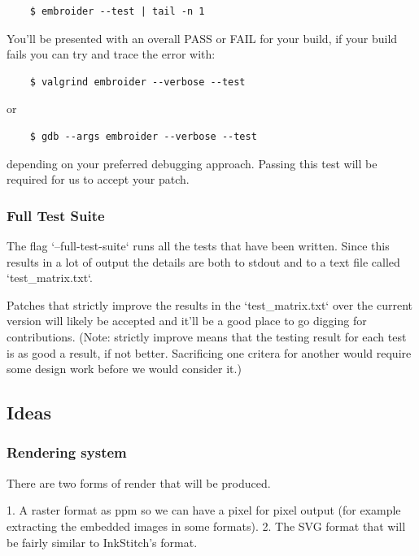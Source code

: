 \documentclass[a4paper, 11pt]{report}
\begin{document}
\begin{verbatim}
    $ embroider --test | tail -n 1
\end{verbatim}

You'll be presented with an overall PASS or FAIL for your build,
if your build fails you can try and trace the error with:

\begin{verbatim}
    $ valgrind embroider --verbose --test
  \end{verbatim}

or

\begin{verbatim}
    $ gdb --args embroider --verbose --test
  \end{verbatim}

depending on your preferred debugging approach. Passing this test
will be required for us to accept your patch.

\subsubsection{Full Test Suite}

The flag `--full-test-suite` runs all the tests that have been written.
Since this results in a lot of output the details are both to stdout
and to a text file called `test\_matrix.txt`.

Patches that strictly improve the results in the `test\_matrix.txt` over
the current version will likely be accepted and it'll be a good place
to go digging for contributions. (Note: strictly improve means that
the testing result for each test is as good a result, if not better.
Sacrificing one critera for another would require some design work
before we would consider it.)

\subsection{Ideas}

\subsubsection{Rendering system}

There are two forms of render that will be produced.

1. A raster format as ppm so we can have a pixel for pixel output (for example extracting the embedded images in some formats).
2. The SVG format that will be fairly similar to InkStitch's format.
\end{document}
